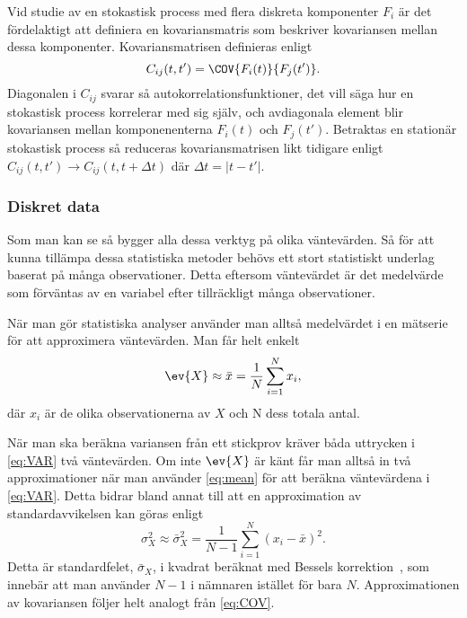 Vid studie av en stokastisk process med flera diskreta komponenter $F_i$ är det fördelaktigt att definiera en kovariansmatris som beskriver kovariansen mellan dessa komponenter. Kovariansmatrisen definieras enligt 
\begin{equation}
\label{eq:kovmatris}
    C_{ij}(t, t') = \COV{F_i(t)}{F_j(t')}.
\end{equation}
Diagonalen i $C_{ij}$ svarar så autokorrelationsfunktioner, det vill säga hur en stokastisk process korrelerar med sig själv, och avdiagonala element blir kovariansen mellan komponenenterna $F_i(t)$ och $F_j(t')$. Betraktas en stationär stokastisk process så reduceras kovariansmatrisen likt tidigare enligt $C_{ij}(t,t')\to C_{ij}(t,t+\Delta t)$ där $\Delta t = |t-t'|$. 


\subsubsection{Diskret data}
\label{seq:diskretdata}
Som man kan se så bygger alla dessa 
verktyg på olika väntevärden. Så för att kunna tillämpa
dessa statistiska metoder behövs ett stort statistiskt underlag baserat på
många observationer. Detta eftersom väntevärdet är det medelvärde
som förväntas av en variabel efter tillräckligt många observationer.

När man gör statistiska analyser använder man alltså medelvärdet i en
mätserie för att approximera väntevärden. Man får helt enkelt
\begin{equation}\label{eq:mean}
\ev{X} \approx \bar{x} = \frac{1}{N} \sum_{i=1}^N x_i,
\end{equation}
där $x_i$ är de olika observationerna av $X$ och N dess totala antal. 

När man ska beräkna variansen från ett stickprov kräver båda uttrycken
i \eqref{eq:VAR} två väntevärden. Om inte $\ev{X}$ är känt får man
alltså in två approximationer när man använder \eqref{eq:mean} för att
beräkna väntevärdena i \eqref{eq:VAR}. Detta bidrar bland annat till att en approximation av standardavvikelsen kan göras enligt
\begin{equation}
\sigma_X^2 \approx \bar{\sigma}_X^2
=  \frac{1}{N-1} \sum_{i=1}^N \left(x_i-\bar{x}\right)^2.
\end{equation}
Detta är standardfelet, $\bar{\sigma}_X$, i kvadrat beräknat med
Bessels korrektion~\cite{Rice_matstat2006}, som innebär att man använder ${N-1}$
i nämnaren istället för bara $N$. Approximationen av kovariansen
följer helt analogt från \eqref{eq:COV}.


